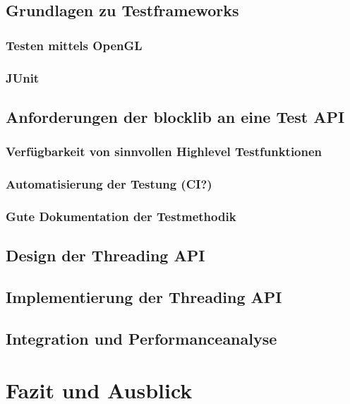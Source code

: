 \documentclass[12pt,a4paper,listof=totocnumbered,parskip=half]{scrreprt}
\begin{document}
\section{Grundlagen zu Testframeworks}
\subsection{Testen mittels OpenGL}
\subsection{JUnit}
\section{Anforderungen der blocklib an eine Test API}
\subsection{Verfügbarkeit von sinnvollen Highlevel Testfunktionen}
\subsection{Automatisierung der Testung (CI?)}
\subsection{Gute Dokumentation der Testmethodik}
\section{Design der Threading API}
\section{Implementierung der Threading API}
\section{Integration und Performanceanalyse}

\chapter{Fazit und Ausblick}

\printnoidxglossaries

\printbibliography[title={Literaturverzeichnis},heading=bibintoc,notkeyword=online]

\printbibliography[title={Quellenverzeichnis},heading=bibintoc,keyword=online] 
\end{document}
